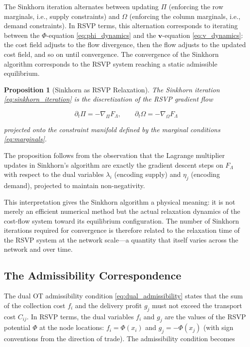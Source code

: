 \documentclass[12pt]{article}
\newtheorem{proposition}{Proposition}[section]
\begin{document}
The Sinkhorn iteration alternates between updating $\Pi$ (enforcing the row marginals, i.e., supply constraints) and $\Omega$ (enforcing the column marginals, i.e., demand constraints). In RSVP terms, this alternation corresponds to iterating between the $\Phi$-equation \eqref{eq:phi_dynamics} and the $\mathbf{v}$-equation \eqref{eq:v_dynamics}: the cost field adjusts to the flow divergence, then the flow adjusts to the updated cost field, and so on until convergence. The convergence of the Sinkhorn algorithm corresponds to the RSVP system reaching a static admissible equilibrium.

\begin{proposition}[Sinkhorn as RSVP Relaxation]
The Sinkhorn iteration \eqref{eq:sinkhorn_iteration} is the discretization of the RSVP gradient flow

\begin{equation}
\partial_t \Pi = -\nabla_\Pi F_\Lambda, \qquad \partial_t \Omega = -\nabla_\Omega F_\Lambda
\label{eq:rsvp_gradient_flow}
\end{equation}

projected onto the constraint manifold defined by the marginal conditions \eqref{eq:marginals}.
\end{proposition}

The proposition follows from the observation that the Lagrange multiplier updates in Sinkhorn's algorithm are exactly the gradient descent steps on $F_\Lambda$ with respect to the dual variables $\lambda_i$ (encoding supply) and $\eta_j$ (encoding demand), projected to maintain non-negativity.

This interpretation gives the Sinkhorn algorithm a physical meaning: it is not merely an efficient numerical method but the actual relaxation dynamics of the cost-flow system toward its equilibrium configuration. The number of Sinkhorn iterations required for convergence is therefore related to the relaxation time of the RSVP system at the network scale---a quantity that itself varies across the network and over time.

\subsection{The Admissibility Correspondence}

The dual OT admissibility condition \eqref{eq:dual_admissibility} states that the sum of the collection cost $f_i$ and the delivery profit $g_j$ must not exceed the transport cost $C_{ij}$. In RSVP terms, the dual variables $f_i$ and $g_j$ are the values of the RSVP potential $\Phi$ at the node locations: $f_i = \Phi(x_i)$ and $g_j = -\Phi(x_j)$ (with sign conventions from the direction of trade). The admissibility condition becomes
\end{document}
